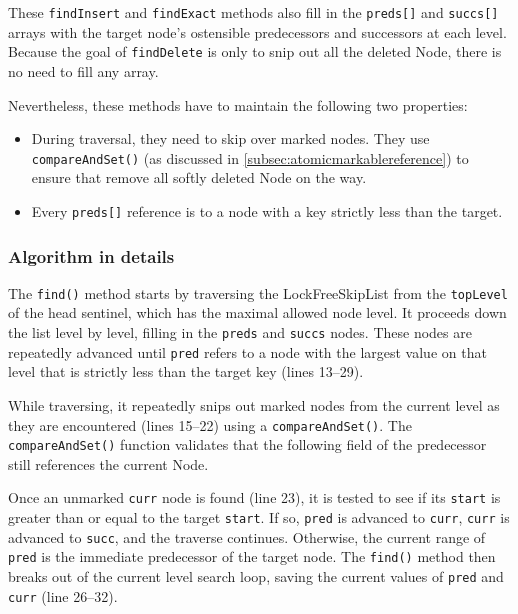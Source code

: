 These \texttt{findInsert} and \texttt{findExact} methods also fill in the \texttt{preds[]} and \texttt{succs[]} arrays with the target node's ostensible predecessors and successors at each level.
Because the goal of \texttt{findDelete} is only to snip out all the deleted Node, there is no need to fill any array.

Nevertheless, these methods have to maintain the following two properties:

\begin{itemize}
    \item During traversal, they need to skip over marked nodes.
    They use \texttt{compareAndSet()} (as discussed in \ref{subsec:atomicmarkablereference}) to ensure that remove all softly deleted Node on the way.
    \item Every \texttt{preds[]} reference is to a node with a key strictly less than the target.
\end{itemize}

\vspace{15pt}

\begin{figure}[!p]
    \centering
    
\end{figure}

\subsubsection{Algorithm in details}
The \texttt{find()} method starts by traversing the LockFreeSkipList from the \texttt{topLevel} of the head sentinel, which has the maximal allowed node level.
It proceeds down the list level by level, filling in the \texttt{preds} and \texttt{succs} nodes.
These nodes are repeatedly advanced until \texttt{pred} refers to a node with the largest value on that level that is strictly less than the target key (lines 13--29).

While traversing, it repeatedly snips out marked nodes from the current level as they are encountered (lines 15--22) using a \texttt{compareAndSet()}.
The \texttt{compareAndSet()} function validates that the following field of the predecessor still references the current Node.

Once an unmarked \texttt{curr} node is found (line 23), it is tested to see if its \texttt{start} is greater than or equal to the target \texttt{start}.
If so, \texttt{pred} is advanced to \texttt{curr}, \texttt{curr} is advanced to \texttt{succ}, and the traverse continues.
Otherwise, the current range of \texttt{pred} is the immediate predecessor of the target node.
The \texttt{find()} method then breaks out of the current level search loop, saving the current values of \texttt{pred} and \texttt{curr} (line 26--32).

